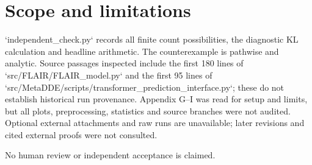 \documentclass[10pt]{article}
\begin{document}
\section*{Scope and limitations}
`independent\_check.py` records all finite count possibilities, the diagnostic KL calculation and headline arithmetic. The counterexample is pathwise and analytic. Source passages inspected include the first 180 lines of `src/FLAIR/FLAIR\_model.py` and the first 95 lines of `src/MetaDDE/scripts/transformer\_prediction\_interface.py`; these do not establish historical run provenance. Appendix G–I was read for setup and limits, but all plots, preprocessing, statistics and source branches were not audited. Optional external attachments and raw runs are unavailable; later revisions and cited external proofs were not consulted.\par
No human review or independent acceptance is claimed.\par
\end{document}
